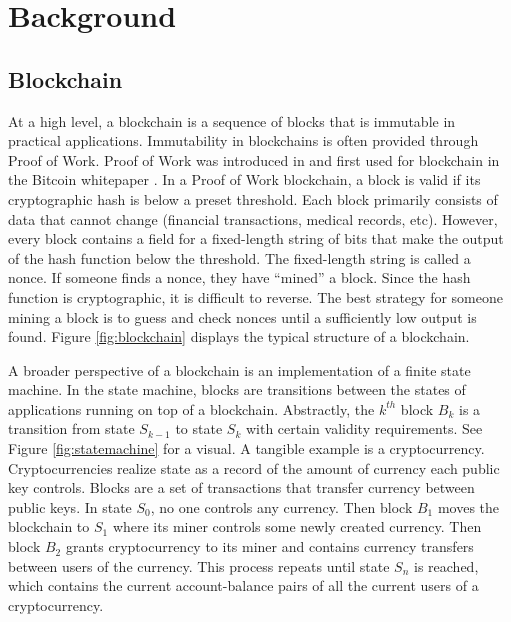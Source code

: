 \section{Background}
\label{sec:background}

\subsection{Blockchain}

At a high level, a blockchain is a sequence of blocks that is immutable in practical applications.
Immutability in blockchains is often provided through Proof of Work.
Proof of Work was introduced in \cite{dwork1992PoW} and first used for blockchain in the Bitcoin whitepaper \cite{nakamoto2009Bitcoin}.
In a Proof of Work blockchain, a block is valid if its cryptographic hash is below a preset threshold.
Each block primarily consists of data that cannot change (financial transactions, medical records, etc).
However, every block contains a field for a fixed-length string of bits that make the output of the hash function below the threshold.
The fixed-length string is called a nonce.
If someone finds a nonce, they have ``mined'' a block.
Since the hash function is cryptographic, it is difficult to reverse.
The best strategy for someone mining a block is to guess and check nonces until a sufficiently low output is found.
Figure \ref{fig:blockchain} displays the typical structure of a blockchain.



A broader perspective of a blockchain is an implementation of a finite state machine.
In the state machine, blocks are transitions between the states of applications running on top of a blockchain.
Abstractly, the $k^{th}$ block $B_k$ is a transition from state $S_{k-1}$ to state $S_k$ with certain validity requirements.
See Figure \ref{fig:statemachine} for a visual.
A tangible example is a cryptocurrency.
Cryptocurrencies realize state as a record of the amount of currency each public key controls.
Blocks are a set of transactions that transfer currency between public keys.
In state $S_0$, no one controls any currency.
Then block $B_1$ moves the blockchain to $S_1$ where its miner controls some newly created currency.
Then block $B_2$ grants cryptocurrency to its miner and contains currency transfers between users of the currency.
This process repeats until state $S_n$ is reached, which contains the current account-balance pairs of all the current users of a cryptocurrency.

